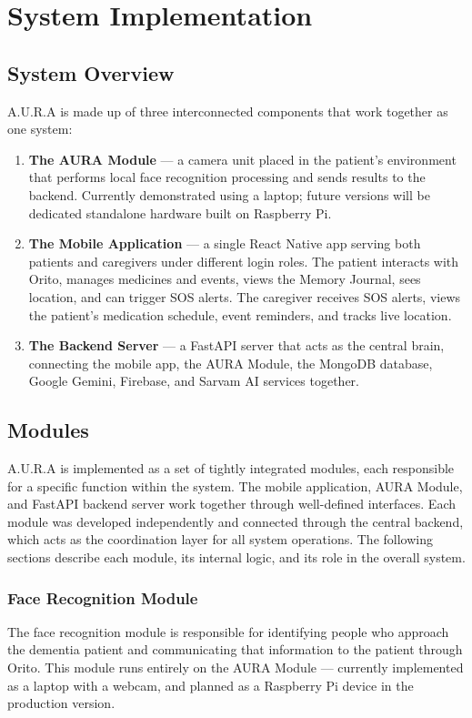 \chapter{System Implementation}
\section{System Overview}
A.U.R.A is made up of three interconnected components that work together as one system:
\begin{enumerate}
    \item \textbf{The AURA Module} --- a camera unit placed in the patient's environment that performs local face recognition processing and sends results to the backend. Currently demonstrated using a laptop; future versions will be dedicated standalone hardware built on Raspberry Pi.
    \item \textbf{The Mobile Application} --- a single React Native app serving both patients and caregivers under different login roles. The patient interacts with Orito, manages medicines and events, views the Memory Journal, sees location, and can trigger SOS alerts. The caregiver receives SOS alerts, views the patient's medication schedule, event reminders, and tracks live location.
    \item \textbf{The Backend Server} --- a FastAPI server that acts as the central brain, connecting the mobile app, the AURA Module, the MongoDB database, Google Gemini, Firebase, and Sarvam AI services together.
\end{enumerate}

\section{Modules}
A.U.R.A is implemented as a set of tightly integrated modules, each responsible for a specific function within the system. The mobile application, AURA Module, and FastAPI backend server work together through well-defined interfaces. Each module was developed independently and connected through the central backend, which acts as the coordination layer for all system operations. The following sections describe each module, its internal logic, and its role in the overall system.

\subsection{Face Recognition Module}
The face recognition module is responsible for identifying people who approach the dementia patient and communicating that information to the patient through Orito. This module runs entirely on the AURA Module --- currently implemented as a laptop with a webcam, and planned as a Raspberry Pi device in the production version.

